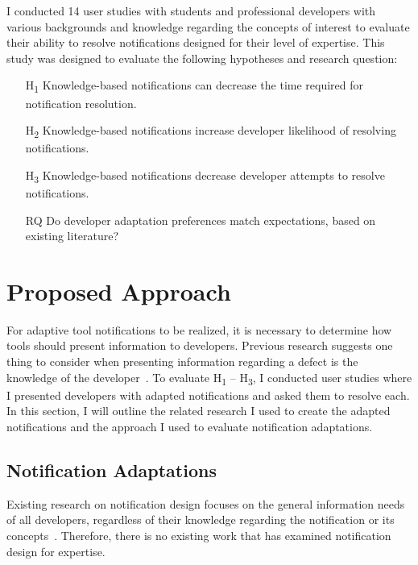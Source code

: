 I conducted 14 user studies with students and professional developers with various backgrounds and knowledge regarding the concepts of interest to evaluate their ability to resolve notifications designed for their level of expertise. This study was designed to evaluate the following hypotheses and research question:
\begin{itemize}
    \item [H\textsubscript{1}] Knowledge-based notifications can decrease the time required for notification resolution.
    \item [H\textsubscript{2}] Knowledge-based notifications increase developer likelihood of resolving notifications. 
    \item [H\textsubscript{3}] Knowledge-based notifications decrease developer attempts to resolve notifications.
    \item[RQ] Do developer adaptation preferences match expectations, based on existing literature?
\end{itemize}


\section{Proposed Approach}

For adaptive tool notifications to be realized, it is necessary to determine how tools should present information to developers. Previous research suggests one thing to consider when presenting information regarding a defect is the knowledge of the developer~\cite{johnson2016cross}.
To evaluate H\textsubscript{1} -- H\textsubscript{3}, I conducted user studies where I presented developers with adapted notifications and asked them to resolve each. In this section, I will outline the related research I used to create the adapted notifications and the approach I used to evaluate notification adaptations.

\subsection{Notification Adaptations}

Existing research on notification design focuses on the general information needs of all developers, regardless of their knowledge regarding the notification or its concepts~\cite{smith2015questions, barik14, robillard2014recommendation}. Therefore, there is no existing work that has examined notification design for expertise. 

